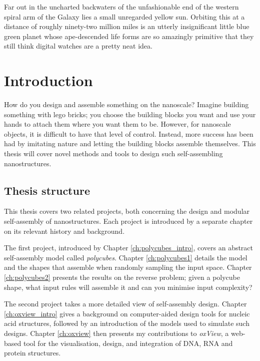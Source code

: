 \begin{savequote}[8cm]
Far out in the uncharted backwaters of the unfashionable end of the western spiral arm of the Galaxy lies a small unregarded yellow sun. Orbiting this at a distance of roughly ninety-two million miles is an utterly insignificant little blue green planet whose ape-descended life forms are so amazingly primitive that they still think digital watches are a pretty neat idea.
\end{savequote}

\chapter{Introduction}\label{ch:1-intro}

\minitoc

How do you design and assemble something on the nanoscale? Imagine building something with lego bricks; you choose the building blocks you want and use your hands to attach them where you want them to be. However, for nanoscale objects, it is difficult to have that level of control. Instead, more success has been had by imitating nature and letting the building blocks assemble themselves. This thesis will cover novel methods and tools to design such self-assembling nanostructures.

\section{Thesis structure}
This thesis covers two related projects, both concerning the design and modular self-assembly of nanostructures. Each project is introduced by a separate chapter on its relevant history and background.

The first project, introduced by Chapter \ref{ch:polycubes_intro}, covers an abstract self-assembly model called \emph{polycubes}. Chapter \ref{ch:polycubes1} details the model and the shapes that assemble when randomly sampling the input space. Chapter \ref{ch:polycubes2} presents the results on the reverse problem; given a polycube shape, what input rules will assemble it and can you minimise input complexity?

The second project takes a more detailed view of self-assembly design. Chapter \ref{ch:oxview_intro} gives a background on computer-aided design tools for nucleic acid structures, followed by an introduction of the models used to simulate such designs. Chapter \ref{ch:oxview} then presents my contributions to \emph{oxView}, a web-based tool for the visualisation, design, and integration of DNA, RNA and protein structures.

